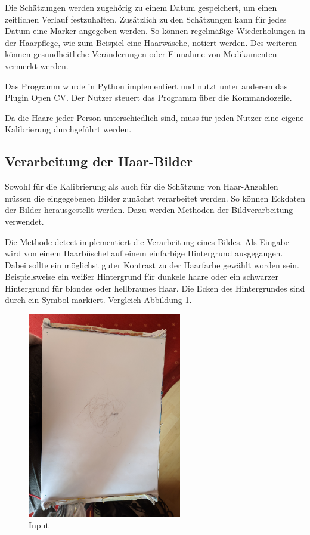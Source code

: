 \documentclass[german,a4paper, 12pt]{llncs}
\begin{document}
Die Schätzungen werden zugehörig zu einem Datum gespeichert, um einen zeitlichen Verlauf festzuhalten.
Zusätzlich zu den Schätzungen kann für jedes Datum eine Marker angegeben werden. So können regelmäßige Wiederholungen in der Haarpflege, wie zum Beispiel eine Haarwäsche, notiert werden. Des weiteren können gesundheitliche Veränderungen oder Einnahme von Medikamenten vermerkt werden.

Das Programm wurde in Python implementiert und nutzt unter anderem das Plugin Open CV.
Der Nutzer steuert das Programm über die Kommandozeile.\cite{opencv}

Da die Haare jeder Person unterschiedlich sind, muss für jeden Nutzer eine eigene Kalibrierung durchgeführt werden.

\subsection{Verarbeitung der Haar-Bilder}

Sowohl für die Kalibrierung als auch für die Schätzung von Haar-Anzahlen müssen die eingegebenen Bilder zunächst verarbeitet werden. So können Eckdaten der Bilder herausgestellt werden. Dazu werden Methoden der Bildverarbeitung verwendet.

Die Methode detect implementiert die Verarbeitung eines Bildes.
Als Eingabe wird von einem Haarbüschel auf einem einfarbige Hintergrund ausgegangen. Dabei sollte ein möglichst guter Kontrast zu der Haarfarbe gewählt worden sein. Beispielsweise ein weißer Hintergrund für dunkele haare oder ein schwarzer Hintergrund für blondes oder hellbraunes Haar. Die Ecken des Hintergrundes sind durch ein Symbol markiert. Vergleich Abbildung \ref{img:input}.

\begin{figure}[H]
	\centering
	\includegraphics[width=0.6\textwidth]{fig64/00IMG_20200406_153354_12_g_15.jpg}
	\caption[]{Input}
	\label{img:input}
\end{figure}
\end{document}
